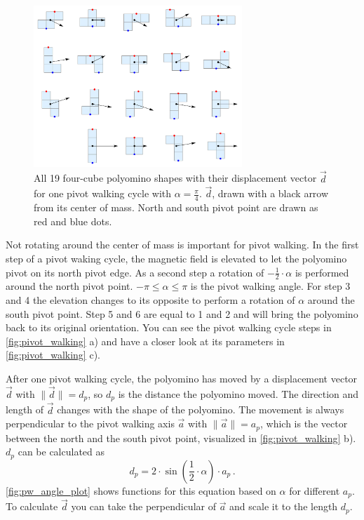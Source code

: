 \begin{figure}
	\centering
	\includegraphics[width=0.70\textwidth]{figures/displacement_pivot_walking.pdf}
	\caption[Polyomino shapes with different displacement vectors]{All 19 four-cube polyomino shapes with their displacement vector $\vec{d}$ for one pivot walking cycle with $\alpha = \frac{\pi}{4}$. $\vec{d}$, drawn with a black arrow from its center of mass. North and south pivot point are drawn as red and blue dots.}
	\label{fig:displacement_pivot_walking}
\end{figure}

Not rotating around the center of mass is important for pivot walking.
In the first step of a pivot waking cycle, the magnetic field is elevated to let the polyomino pivot on its north pivot edge.
As a second step a rotation of $-\frac{1}{2} \cdot \alpha$ is performed around the north pivot point.
$-\pi \leq \alpha \leq \pi$ is the pivot walking angle.
For step 3 and 4 the elevation changes to its opposite to perform a rotation of $\alpha$ around the south pivot point.
Step 5 and 6 are equal to 1 and 2 and will bring the polyomino back to its original orientation.
You can see the pivot walking cycle steps in \autoref{fig:pivot_walking} a) and have a closer look at its parameters in \autoref{fig:pivot_walking} c).

After one pivot walking cycle, the polyomino has moved by a displacement vector $\vec{d}$ with $\lVert \vec{d} \rVert = d_p$, so $d_p$ is the distance the polyomino moved.
The direction and length of $\vec{d}$ changes with the shape of the polyomino.
The movement is always perpendicular to the pivot walking axis $\vec{a}$ with $\lVert \vec{a} \rVert = a_p$, which is the vector between the north and the south pivot point, visualized in \autoref{fig:pivot_walking} b).
$d_p$ can be calculated as
\begin{equation}
d_p = 2 \cdot \sin\left(\frac{1}{2} \cdot \alpha \right) \cdot a_p \,.
\end{equation}
\autoref{fig:pw_angle_plot} shows functions for this equation based on $\alpha$ for different $a_p$.
To calculate $\vec{d}$ you can take the perpendicular of $\vec{a}$ and scale it to the length $d_p$.

